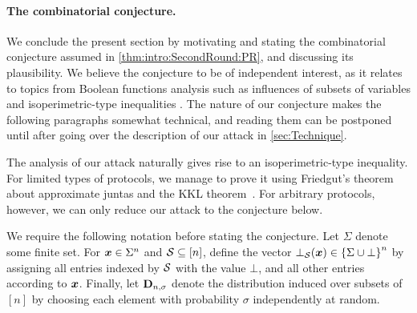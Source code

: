 \paragraph{The combinatorial conjecture.}
We conclude the present section by motivating and stating the combinatorial conjecture assumed in \cref{thm:intro:SecondRound:PR}, and discussing its plausibility. We believe the conjecture to be of independent interest, as it relates to topics from Boolean functions analysis such as influences of subsets of variables \cite{Odonnel14} and isoperimetric-type inequalities \cite{MosselORSS2006,MosselOS2013}. The nature of our conjecture makes the following paragraphs somewhat technical, and reading them can be postponed until after going over the description of our attack in \cref{sec:Technique}.

The analysis of our attack naturally gives rise to an isoperimetric-type inequality. For limited types of protocols, we manage to prove it using Friedgut's theorem~\cite{Friedgut98} about approximate juntas and the KKL theorem~\cite{KKL88}. For arbitrary protocols, however, we can only %
reduce our attack to the conjecture below.

We require the following notation before stating the conjecture. Let $\Sigma$ denote some finite set.
For ${ \boldsymbol{x}}\in \Sigma^n$ and $\mathcal{S} \subseteq [n]$, define the vector $\bot_{\mathcal{S}}({ \boldsymbol{x}}) \in \left\{\Sigma \cup \bot\right\}^n$ by assigning all entries indexed by $\mathcal{S}$ with the value $\bot$, and all other entries according to ${ \boldsymbol{x}}$. Finally, let $\mathbf{D}_{n,\sigma}$ denote the distribution induced over subsets of $[n]$ by choosing each element with probability $\sigma$ independently at random.

\def\MainConj{
For any $\sigma,\lambda >0$ there exists $\delta>0$ such that the following holds for large enough $n\in \N$: let $\Sigma$ be a finite alphabet, and let $\cA_0,\cA_1 \subseteq \sbn$ be two sets such that for both $b\in \zo$:

\begin{align*}
\ppr{\cs\gets \bns}{\ppr{\vr \gets \Sigma^n}{\vr,\bot_{\cS}(\vr) \in \cA_b} \ge \lambda } \ge 1-\delta.
\end{align*}
Then,
\begin{align*}
\ppr{\substack{\cS \gets \bns \vspace{.05in}\\ \vr\gets \Sigma^n }}{\forall b\in \zo\colon \set{\vr,\bot_{\cS}(\vr)} \cap \cA_b \neq \emptyset} \ge \delta.
\end{align*}
}

